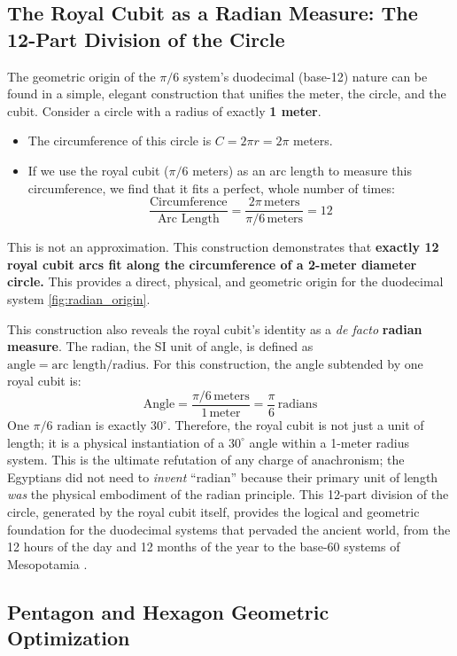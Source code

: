 \documentclass[11pt]{article}
\begin{document}
\subsection{The Royal Cubit as a Radian Measure: The 12-Part Division of the Circle}

The geometric origin of the $\pi/6$ system's duodecimal (base-12) nature can be found in a simple, elegant construction that unifies the meter, the circle, and the cubit. Consider a circle with a radius of exactly \textbf{1 meter}.
\begin{itemize}
    \item The circumference of this circle is $C = 2\pi r = 2\pi$ meters.
    \item If we use the royal cubit ($\pi/6$ meters) as an arc length to measure this circumference, we find that it fits a perfect, whole number of times:
    \[
    \frac{\text{Circumference}}{\text{Arc Length}} = \frac{2\pi\,\text{meters}}{\pi/6\,\text{meters}} = 12
    \]
\end{itemize}
This is not an approximation. This construction demonstrates that \textbf{exactly 12 royal cubit arcs fit along the circumference of a 2-meter diameter circle.} This provides a direct, physical, and geometric origin for the duodecimal system \ref{fig:radian_origin}.

This construction also reveals the royal cubit's identity as a \textit{de facto} \textbf{radian measure}. The radian, the SI unit of angle, is defined as $\text{angle} = \text{arc length} / \text{radius}$. For this construction, the angle subtended by one royal cubit is:
\[
\text{Angle} = \frac{\pi/6\,\text{meters}}{1\,\text{meter}} = \frac{\pi}{6}\,\text{radians}
\]
One $\pi/6$ radian is exactly \textbf{$30^\circ$}. Therefore, the royal cubit is not just a unit of length; it is a physical instantiation of a $30^\circ$ angle within a 1-meter radius system. This is the ultimate refutation of any charge of anachronism; the Egyptians did not need to \textit{invent} ``radian'' because their primary unit of length \textit{was} the physical embodiment of the radian principle. This 12-part division of the circle, generated by the royal cubit itself, provides the logical and geometric foundation for the duodecimal systems that pervaded the ancient world, from the 12 hours of the day and 12 months of the year to the base-60 systems of Mesopotamia \cite{neugebauer1969exact}.


\subsection{Pentagon and Hexagon Geometric Optimization}
\end{document}
